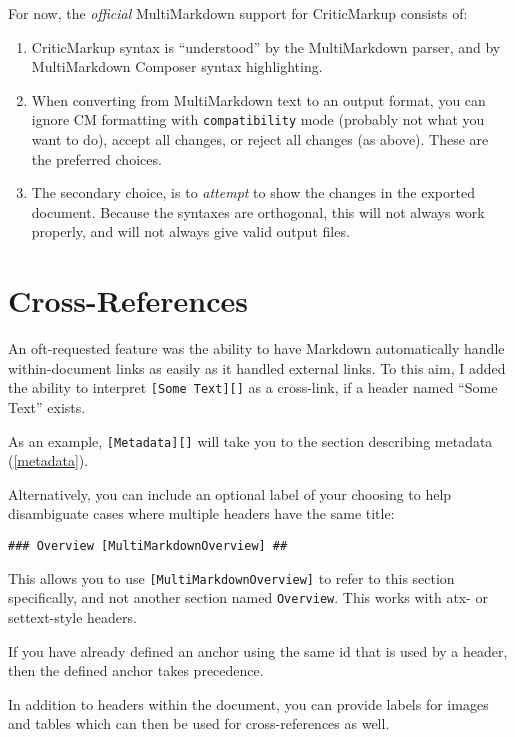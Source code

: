 For now, the \emph{official} MultiMarkdown support for CriticMarkup consists of:

\begin{enumerate}
\item CriticMarkup syntax is ``understood'' by the MultiMarkdown parser, and by MultiMarkdown Composer syntax highlighting.

\item When converting from MultiMarkdown text to an output format, you can ignore CM formatting with \texttt{compatibility} mode (probably not what you want to do), accept all changes, or reject all changes (as above). These are the preferred choices.

\item The secondary choice, is to \emph{attempt} to show the changes in the exported document. Because the syntaxes are orthogonal, this will not always work properly, and will not always give valid output files.

\end{enumerate}

\section{Cross-References}
\label{cross-references}

An oft-requested feature was the ability to have Markdown automatically handle
within-document links as easily as it handled external links. To this aim, I
added the ability to interpret \texttt{[Some Text][]} as a cross-link, if a header
named ``Some Text'' exists.

As an example, \texttt{[Metadata][]} will take you to the
section describing metadata (\autoref{metadata}).

Alternatively, you can include an optional label of your choosing to help
disambiguate cases where multiple headers have the same title:

\begin{verbatim}
### Overview [MultiMarkdownOverview] ##
\end{verbatim}

This allows you to use \texttt{[MultiMarkdownOverview]} to refer to this section
specifically, and not another section named \texttt{Overview}. This works with atx-
or settext-style headers.

If you have already defined an anchor using the same id that is used by a
header, then the defined anchor takes precedence.

In addition to headers within the document, you can provide labels for images
and tables which can then be used for cross-references as well.

